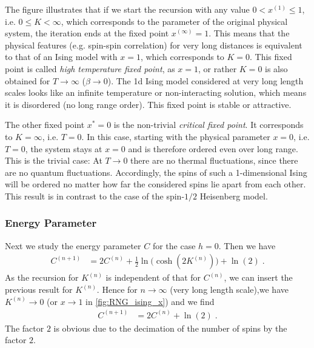 The figure illustrates that if we start the recursion with any value $0< x^{(1)}\le 1$, i.e. $0\le  K< \infty$, which 
corresponds to the parameter of the original physical system, the iteration ends at the fixed point 
$x^{(\infty)}=1$. This means that the physical features (e.g. spin-spin correlation)
for very long distances is equivalent to that of an Ising model with $x=1$, which corresponds to $K=0$. This fixed point is called {\em high temperature fixed point}, as
$x=1$, or rather $K=0$ is also obtained for $T\to \infty$ ($\beta\to 0$).
The 1d Ising model considered at very long length scales looks like an infinite temperature 
or non-interacting solution, which means it is disordered (no long range order).
This fixed point is stable or attractive.

The other fixed point $x^{*}=0$ is the non-trivial {\em critical fixed point}.  It corresponds to $K=\infty$, i.e. $T=0$.
In this case, starting with the physical parameter $x=0$, i.e. $T=0$, the system stays at $x=0$
and is therefore ordered even over long range. This is the trivial case: At $T\to 0$ there are no thermal fluctuations, since there are no quantum fluctuations. Accordingly, the spins of such a 1-dimensional Ising will be ordered no matter how far the considered spins lie apart from each other. This result is in contrast to the case of the spin-$1/2$ Heisenberg model.





\subsubsection{Energy Parameter}
Next we study the energy parameter $C$ for the case $h=0$. Then we have
%
\begin{align}\label{eq:RNG:Energy:parameter}
 C^{(n+1)} &= 2 C^{(n)} + \frac{1}{2}\ln\bigg(\cosh(2K^{(n)})\bigg)+ \ln(2) \;.
\end{align}
%
As the recursion for $K^{(n)}$ is independent of that for
$C^{(n)}$, we can insert the previous result for $K^{(n)}$. Hence for $n\to\infty$ (very long length scale),we have $K^{(n)}\to 0$ (or $x\to 1$ in \autoref{fig:RNG_ising_x}) and we find
%
\begin{align*}
 C^{(n+1)} &= 2C^{(n)} + \ln(2)\;.
\end{align*}
%
The factor $2$ is obvious due to the decimation of the number of spins by the factor $2$.

